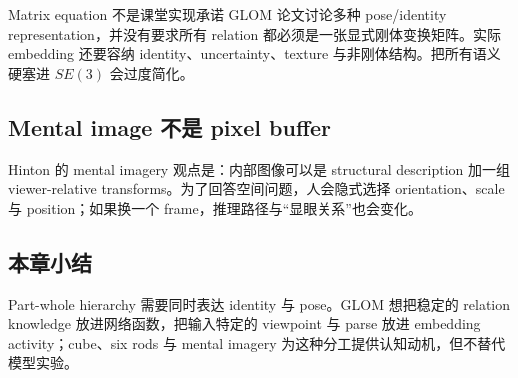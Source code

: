 \begin{warningbox}{Matrix equation 不是课堂实现承诺}
GLOM 论文讨论多种 pose/identity representation，并没有要求所有 relation 都必须是一张显式刚体变换矩阵。实际 embedding 还要容纳 identity、uncertainty、texture 与非刚体结构。把所有语义硬塞进 $SE(3)$ 会过度简化。
\end{warningbox}

\subsection{Mental image 不是 pixel buffer}

Hinton 的 mental imagery 观点是：内部图像可以是 structural description 加一组 viewer-relative transforms。为了回答空间问题，人会隐式选择 orientation、scale 与 position；如果换一个 frame，推理路径与“显眼关系”也会变化。



\subsection{本章小结}

Part-whole hierarchy 需要同时表达 identity 与 pose。GLOM 想把稳定的 relation knowledge 放进网络函数，把输入特定的 viewpoint 与 parse 放进 embedding activity；cube、six rods 与 mental imagery 为这种分工提供认知动机，但不替代模型实验。

